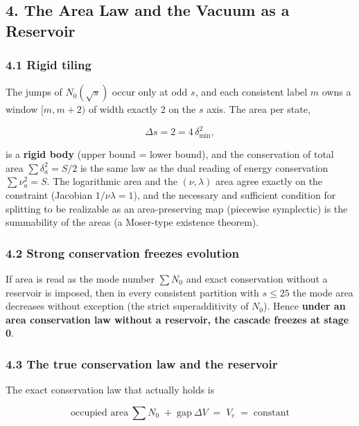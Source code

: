 \documentclass[
]{article}
\begin{document}
\subsection{4. The Area Law and the Vacuum as a
Reservoir}\label{the-area-law-and-the-vacuum-as-a-reservoir}

\subsubsection{4.1 Rigid tiling}\label{rigid-tiling}

The jumps of \(N_0(\sqrt s)\) occur only at odd \(s\), and each
consistent label \(m\) owns a window \([m,m+2)\) of width exactly 2 on
the \(s\) axis. The area per state,

\[
\Delta s=2=4\,\delta_{\min}^2,
\]

is a \textbf{rigid body} (upper bound = lower bound), and the
conservation of total area \(\sum\delta_a^2=S/2\) is the same law as the
dual reading of energy conservation \(\sum\nu_a^2=S\). The logarithmic
area and the \((\nu,\lambda)\) area agree exactly on the constraint
(Jacobian \(1/\nu\lambda=1\)), and the necessary and sufficient
condition for splitting to be realizable as an area-preserving map
(piecewise symplectic) is the summability of the areas (a Moser-type
existence theorem).

\subsubsection{4.2 Strong conservation freezes
evolution}\label{strong-conservation-freezes-evolution}

If area is read as the mode number \(\sum N_0\) and exact conservation
without a reservoir is imposed, then in every consistent partition with
\(s\le25\) the mode area decreases without exception (the strict
superadditivity of \(N_0\)). Hence \textbf{under an area conservation
law without a reservoir, the cascade freezes at stage 0}.

\subsubsection{4.3 The true conservation law and the
reservoir}\label{the-true-conservation-law-and-the-reservoir}

The exact conservation law that actually holds is

\[
\text{occupied area}\ \textstyle\sum N_0\;+\;\text{gap}\ \Delta V\;=\;V_c\;=\;\text{constant}
\]
\end{document}
